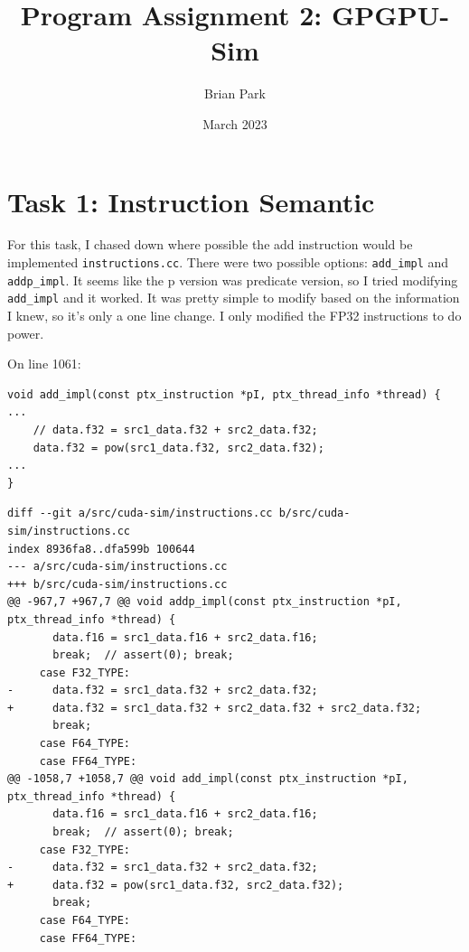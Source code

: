 \documentclass{article}
\title{Program Assignment 2: GPGPU-Sim}
\author{Brian Park}
\affil{North Carolina State University, Computer Engineering 786}
\date{March 2023}
\begin{document}
\maketitle

\section{Task 1: Instruction Semantic}
For this task, I chased down where possible the add instruction would be implemented \verb|instructions.cc|. There were two possible options: \verb|add_impl| and \verb|addp_impl|. It seems like the p version was predicate version, so I tried modifying \verb|add_impl| and it worked. It was pretty simple to modify based on the information I knew, so it's only a one line change. I only modified the FP32 instructions to do power.

On line 1061:

\begin{verbatim}
void add_impl(const ptx_instruction *pI, ptx_thread_info *thread) {
...
    // data.f32 = src1_data.f32 + src2_data.f32;
    data.f32 = pow(src1_data.f32, src2_data.f32);
...
}
\end{verbatim}

\begin{verbatim}
diff --git a/src/cuda-sim/instructions.cc b/src/cuda-sim/instructions.cc
index 8936fa8..dfa599b 100644
--- a/src/cuda-sim/instructions.cc
+++ b/src/cuda-sim/instructions.cc
@@ -967,7 +967,7 @@ void addp_impl(const ptx_instruction *pI, ptx_thread_info *thread) {
       data.f16 = src1_data.f16 + src2_data.f16;
       break;  // assert(0); break;
     case F32_TYPE:
-      data.f32 = src1_data.f32 + src2_data.f32;
+      data.f32 = src1_data.f32 + src2_data.f32 + src2_data.f32;
       break;
     case F64_TYPE:
     case FF64_TYPE:
@@ -1058,7 +1058,7 @@ void add_impl(const ptx_instruction *pI, ptx_thread_info *thread) {
       data.f16 = src1_data.f16 + src2_data.f16;
       break;  // assert(0); break;
     case F32_TYPE:
-      data.f32 = src1_data.f32 + src2_data.f32;
+      data.f32 = pow(src1_data.f32, src2_data.f32);
       break;
     case F64_TYPE:
     case FF64_TYPE:
\end{verbatim}
\end{document}
